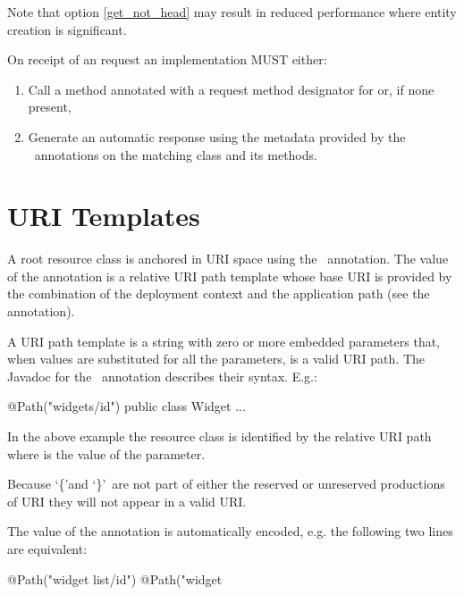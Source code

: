 Note that option \ref{get_not_head} may result in reduced performance where entity creation is significant.

On receipt of an  request an implementation MUST either:

\begin{enumerate}
\item Call a method annotated with a request method designator for  or, if none present,
\item Generate an automatic response using the metadata provided by the \jaxrs\ annotations on the matching class and its methods.
\end{enumerate}

\section{URI Templates}
\label{uritemplates}

A root resource class is anchored in URI space using the \Path\ annotation. The value of the annotation is a relative URI path template whose base URI is provided by the combination of the deployment context and the application path (see the  annotation).

A URI path template is a string with zero or more embedded parameters that, when values are substituted for all the parameters, is a valid URI\cite{uri} path. The Javadoc for the \Path\ annotation describes their syntax. E.g.:

\begin{listing}{1}
@Path("widgets/{id}")
public class Widget {
  ...
}\end{listing}

In the above example the  resource class is identified by the relative URI path  where  is the value of the  parameter.

\begin{nnnote}Because \lq\{\rq and \lq\}\rq\ are not part of either the reserved or unreserved productions of URI\cite{uri} they will not appear in a valid URI.\end{nnnote}

The value of the annotation is automatically encoded, e.g. the following two lines are equivalent:

\begin{listing}{1}
@Path("widget list/{id}")
@Path("widget%
\end{listing}

